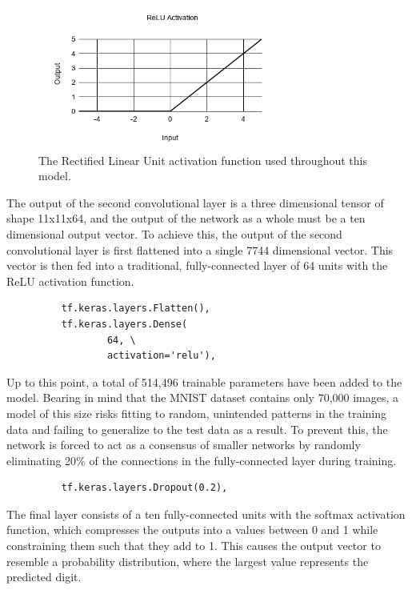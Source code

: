 \documentclass[transmag]{IEEEtran}
\begin{document}
\begin{figure}[H]
  \includegraphics[width=3in]{fig2}
  \caption{The Rectified Linear Unit activation function used throughout 
  this model.\label{fig2}}
\end{figure}

The output of the second convolutional layer is a three dimensional tensor of
shape 11x11x64, and the output of the network as a whole must be a ten 
dimensional output vector. To achieve this, the output of the second 
convolutional layer is first flattened into a single 7744 dimensional vector.
This vector is then fed into a traditional, fully-connected layer of 64 units
with the ReLU activation function.

\begin{figure}[H]
\begin{Verbatim}
    tf.keras.layers.Flatten(),
    tf.keras.layers.Dense(
            64, \
            activation='relu'),
\end{Verbatim}
\end{figure}

Up to this point, a total of 514,496 trainable parameters have been added to
the model. Bearing in mind that the MNIST dataset contains only 70,000 images,
a model of this size risks fitting to random, unintended patterns in the 
training data and failing to generalize to the test data as a result. To
prevent this, the network is forced to act as a consensus of smaller networks
by randomly eliminating 20\% of the connections in the fully-connected layer
during training.

\begin{figure}[H]
\begin{Verbatim}
    tf.keras.layers.Dropout(0.2),
\end{Verbatim}
\end{figure}


The final layer consists of a ten fully-connected units with
the softmax activation function, which compresses the outputs into a values
between 0 and 1 while constraining them such that they add to 1. This causes
the output vector to resemble a probability distribution, where the largest
value represents the predicted digit. 
\end{document}
